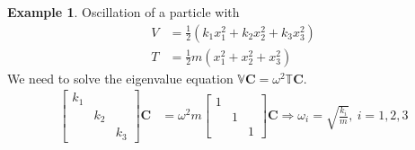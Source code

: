 \documentclass[twoside,9pt]{article}
\numberwithin{equation}{section} %
\newcommand{\lms}{\fontfamily{lmss}\selectfont} %
\theoremstyle{definition}
\newtheorem{example}{\lms Example}[section]
\theoremstyle{remark}
\begin{document}
\begin{example}
Oscillation of a particle with 
\begin{align*}
    V &= \frac{1}{2}(k_1x_1^2 + k_2x_2^2 + k_3x_3^2)\\
    T &= \frac{1}{2}m(x_1^2 + x_2^2 + x_3^2)
\end{align*}
We need to solve the eigenvalue equation $\mathbb V\mathbf C = \omega^2\mathbb T\mathbf C$.
\begin{align*}
    \begin{bmatrix}
        k_1 & & \\
            & k_2 & \\
            & & k_3
    \end{bmatrix}
    \mathbf C &= 
    \omega^2m
    \begin{bmatrix}
        1 & & \\
            & 1 & \\
            & & 1
    \end{bmatrix}\mathbf C
    \Rightarrow
    \omega_i = \sqrt{\frac{k_i}{m}},~i=1,2,3
\end{align*}
\end{example}
\end{document}
